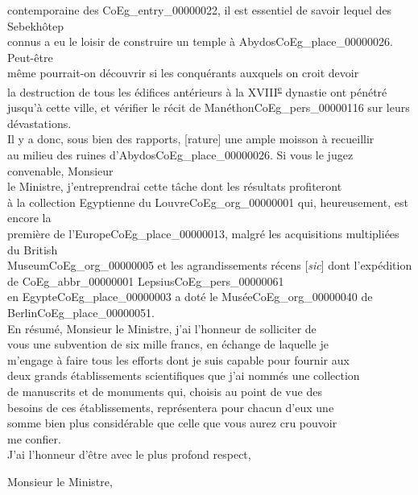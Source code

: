 \documentclass{book}
\begin{document}
contemporaine des \gls{CoEg_entry_00000022}, il est essentiel de savoir lequel des Sebekhôtep\\
connus a eu le loisir de construire un temple à Abydos\gls{CoEg_place_00000026}. Peut-être\\
même pourrait-on découvrir si les conquérants auxquels on croit devoir\\
la destruction de tous les édifices antérieurs à la XVIII\textsuperscript{\underline{e}} dynastie ont pénétré\\
jusqu’à cette ville, et vérifier le récit de Manéthon\gls{CoEg_pers_00000116} sur leurs dévastations.\\
Il y a donc, sous bien des rapports, [rature] une ample moisson à recueillir\\
au milieu des ruines d’Abydos\gls{CoEg_place_00000026}. Si vous le jugez convenable, Monsieur\\
le Ministre, j’entreprendrai cette tâche dont les résultats profiteront\\
à la collection Egyptienne du Louvre\gls{CoEg_org_00000001} qui, heureusement, est encore la\\
première de l’Europe\gls{CoEg_place_00000013}, malgré les acquisitions multipliées du British\\
Museum\gls{CoEg_org_00000005} et les agrandissements récens [\textit{sic}] dont l’expédition de \gls{CoEg_abbr_00000001} Lepsius\gls{CoEg_pers_00000061}\\
en Egypte\gls{CoEg_place_00000003} a doté le Musée\gls{CoEg_org_00000040} de Berlin\gls{CoEg_place_00000051}.\\
\indent En résumé, Monsieur le Ministre, j’ai l’honneur de solliciter de\\
vous une subvention de six mille francs, en échange de laquelle je\\
m’engage à faire tous les efforts dont je suis capable pour fournir aux\\
deux grands établissements scientifiques que j’ai nommés une collection\\
de manuscrits et de monuments qui, choisis au point de vue des\\
besoins de ces établissements, représentera pour chacun d’eux une\\
somme bien plus considérable que celle que vous aurez cru pouvoir\\
me confier.\\
\indent J’ai l’honneur d’être avec le plus profond respect,\\
\begin{center}Monsieur le Ministre,\end{center}
\end{document}
